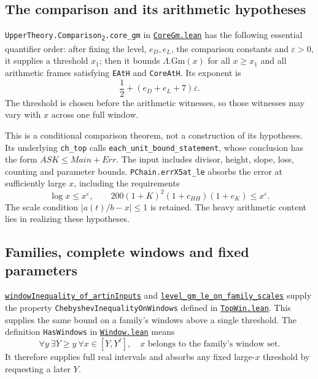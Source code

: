 \documentclass[11pt,a4paper]{article}
\theoremstyle{remark}\newtheorem{remark}[theorem]{Remark}
\begin{document}
\subsection{The comparison and its arithmetic hypotheses}
\texttt{UpperTheory.Comparison\textsubscript{2}.core\_gm}
in \href{https://github.com/Deicyde/riemann-hypothesis/blob/40e56bab/src/Development/AutomorphicArithmetic/PrimitiveCosets/CoreGm.lean}{\texttt{CoreGm.lean}}
has the following essential quantifier order: after fixing the
level, \(e_D,e_L\), the comparison constants and
\(\varepsilon>0\), it supplies a threshold \(x_1\); then it
bounds \(\Lambda.\mathrm{Gm}(x)\) for all \(x\ge x_1\) and all
arithmetic frames satisfying \texttt{EAtH} and \texttt{CoreAtH}.
Its exponent is
\[
 \frac12+(e_D+e_L+7)\varepsilon.
\]
The threshold is chosen before the arithmetic witnesses, so those
witnesses may vary with \(x\) across one full window.

This is a conditional comparison theorem, not a construction of
its hypotheses. Its underlying \texttt{ch\_top} calls
\texttt{each\_unit\_bound\_statement}, whose conclusion has the
form \(ASK\le Main+Err\). The input includes divisor, height,
slope, loss, counting and parameter bounds.
\texttt{PChain.errX5at\_le} absorbs the error at sufficiently
large \(x\), including the requirements
\[
 \log x\le x^\varepsilon,\qquad
 200(1+K)^2(1+c_{HH})(1+e_K)\le x^\varepsilon.
\]
The scale condition \(|a(t)/b-x|\le1\) is retained.
The heavy arithmetic content lies in realizing these hypotheses.

\subsection{Families, complete windows and fixed parameters}
\href{https://github.com/leanprover-community/riemann-hypothesis/blob/40e56bab/src/Development/AutomorphicArithmetic/PrimitiveCosets/WindowInequalityOfArtinInputs.lean}{\texttt{windowInequality\_of\_artinInputs}}
and
\href{https://github.com/leanprover-community/riemann-hypothesis/blob/40e56bab/src/Development/AutomorphicArithmetic/PrimitiveCosets/LevelGmLeOnFamilyScales.lean}{\texttt{level\_gm\_le\_on\_family\_scales}}
supply the property \texttt{ChebyshevInequalityOnWindows} defined in
\href{https://github.com/Deicyde/riemann-hypothesis/blob/40e56bab/src/Formalism/SharpRestriction/RamificationFrobenius/TotientGaloisClasses/TopWin.lean}{\texttt{TopWin.lean}}.
This supplies the same bound on a family's windows above a
single threshold. The definition \texttt{HasWindows} in
\href{https://github.com/Deicyde/riemann-hypothesis/blob/40e56bab/src/Formalism/SharpRestriction/RamificationFrobenius/TotientGaloisClasses/Window.lean}{\texttt{Window.lean}}
means
\[
 \forall y\ \exists Y\ge y\ \forall x\in[Y,Y^{\ell}],
 \quad x\text{ belongs to the family's window set}.
\]
It therefore supplies full real intervals and absorbs any fixed
large-\(x\) threshold by requesting a later \(Y\).
\end{document}
